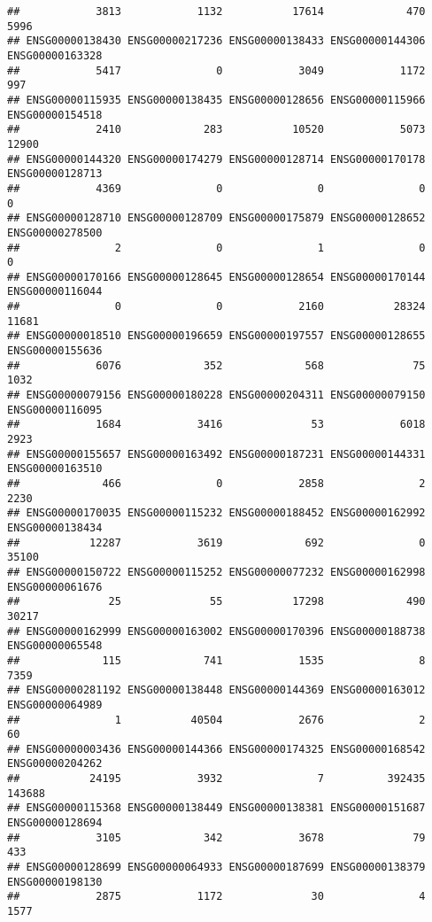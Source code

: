\documentclass[
]{article}
\begin{document}
\begin{verbatim}
##            3813            1132           17614             470            5996 
## ENSG00000138430 ENSG00000217236 ENSG00000138433 ENSG00000144306 ENSG00000163328 
##            5417               0            3049            1172             997 
## ENSG00000115935 ENSG00000138435 ENSG00000128656 ENSG00000115966 ENSG00000154518 
##            2410             283           10520            5073           12900 
## ENSG00000144320 ENSG00000174279 ENSG00000128714 ENSG00000170178 ENSG00000128713 
##            4369               0               0               0               0 
## ENSG00000128710 ENSG00000128709 ENSG00000175879 ENSG00000128652 ENSG00000278500 
##               2               0               1               0               0 
## ENSG00000170166 ENSG00000128645 ENSG00000128654 ENSG00000170144 ENSG00000116044 
##               0               0            2160           28324           11681 
## ENSG00000018510 ENSG00000196659 ENSG00000197557 ENSG00000128655 ENSG00000155636 
##            6076             352             568              75            1032 
## ENSG00000079156 ENSG00000180228 ENSG00000204311 ENSG00000079150 ENSG00000116095 
##            1684            3416              53            6018            2923 
## ENSG00000155657 ENSG00000163492 ENSG00000187231 ENSG00000144331 ENSG00000163510 
##             466               0            2858               2            2230 
## ENSG00000170035 ENSG00000115232 ENSG00000188452 ENSG00000162992 ENSG00000138434 
##           12287            3619             692               0           35100 
## ENSG00000150722 ENSG00000115252 ENSG00000077232 ENSG00000162998 ENSG00000061676 
##              25              55           17298             490           30217 
## ENSG00000162999 ENSG00000163002 ENSG00000170396 ENSG00000188738 ENSG00000065548 
##             115             741            1535               8            7359 
## ENSG00000281192 ENSG00000138448 ENSG00000144369 ENSG00000163012 ENSG00000064989 
##               1           40504            2676               2              60 
## ENSG00000003436 ENSG00000144366 ENSG00000174325 ENSG00000168542 ENSG00000204262 
##           24195            3932               7          392435          143688 
## ENSG00000115368 ENSG00000138449 ENSG00000138381 ENSG00000151687 ENSG00000128694 
##            3105             342            3678              79             433 
## ENSG00000128699 ENSG00000064933 ENSG00000187699 ENSG00000138379 ENSG00000198130 
##            2875            1172              30               4            1577 

\end{verbatim}
\end{document}
